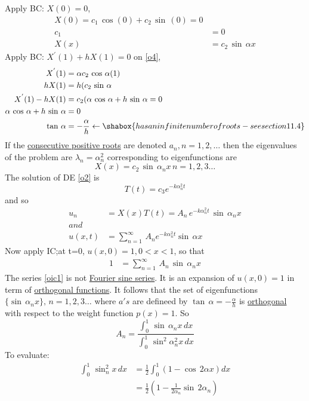 Apply BC: $X(0)=0$,\\
\begin{align}
X(0)=c_1\,\cos(0)+c_2\,\sin\,(0)=0\nonumber\\
c_1&=0\nonumber\\
X(x)&=c_2\,\sin\,\alpha x\label{o4}
\end{align}
Apply BC: $X^{'}(1)+hX(1)=0$ on \eqref{o4},
\begin{align*}
X^{'}(1)&=\alpha c_2\,\cos\,\alpha (1)\\
hX(1)&=h(c_2\,\sin\,\alpha\\
X^{'}(1)-hX(1)&=c_2(\alpha\,\cos\,\alpha+h\,\sin\,\alpha=0\\
\alpha\,\cos\,\alpha+h\,\sin\,\alpha&=0\\
\tan\,\alpha&=-\frac{\alpha}{h}\leftarrow\shabox{has an infinite number of roots-see section 11.4}
\end{align*}
If the \underline{consecutive positive roots} are denoted $a_n,n=1,2,\ldots$ then the eigenvalues of the problem are $\lambda_n=\alpha_n^2$ corresponding to eigenfunctions are\\
$$ X(x)=c_2\,\sin\,\alpha_n x\,n=1,2,3\ldots$$
The solution of DE \eqref{o2} is 
$$T(t)=c_3e^{-k\alpha^2_nt} $$
and so 
\begin{align}
u_n&=X(x)T(t)=A_n\,e^{-k\alpha^2_n t}\,\sin\,\alpha_n x\\
and\,\,\,&\\
u(x,t)&=\sum_{n=1}^\infty\,A_ne^{-k\alpha^2_n t}\sin\,\alpha x
\end{align}
Now apply IC;at t=0, $u(x,0)=1, 0<x<1$, so that
\begin{align}
1&=\sum_{n=1}^\infty\,A_n\,\sin\,\alpha_n x\label{oic1}
\end{align}
The series \eqref{oic1} is not \underline{Fourier sine series}. It is an expansion of $u(x,0)=1$ in term of \underline{orthogonal functions}. It follows that the set of eigenfunctions $\{\sin\,\alpha_n x\},\,n=1,2,3\ldots$ where $a's$ are defineed by $\tan\,\alpha=-\frac{\alpha}{h}$ is \underline{orthogonal} with respect to the weight function $p(x)=1$. So 
\begin{equation}
A_n=\frac{\int_0^1\,\sin\,\alpha_n x\,dx}{\int_0^1\,\sin^2 \alpha^2_n x\,dx}\label{a1}
\end{equation}
To evaluate:
\begin{align}
\int_0^1\,\sin^2_n x\,dx&=\frac{1}{2}\int_0^1(1-\cos\,2\alpha x)dx\nonumber\\
&=\frac{1}{2}\left(1-\frac{1}{2\alpha_n}\sin\,2\alpha_n\right)\label{a2}
\end{align}
